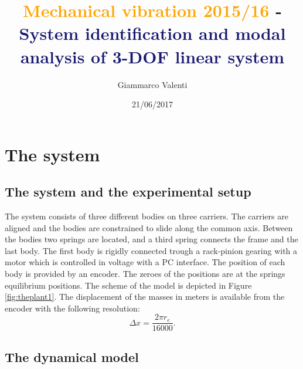 \documentclass[twosided,a4paper]{article}           %
\date{21/06/2017}
\begin{document}
	
	\title{\textcolor{Orange}{Mechanical vibration 2015/16} - \textcolor{MidnightBlue}{System identification and modal analysis of 3-DOF linear system}}
	\author{Giammarco Valenti}
	\maketitle
\section{The system}
\subsection{The system and the experimental setup}
The system consists of three different bodies on three carriers. The carriers are aligned and the bodies are constrained to slide along the common axis. Between the bodies two springs are located, and a third spring connects the frame and the last body. The first body is rigidly connected trough a rack-pinion gearing with a motor which is controlled in voltage with a PC interface. The position of each body is provided by an encoder. The zeroes of the positions are at the springs equilibrium positions. The scheme of the model is depicted in Figure \ref{fig:theplant1}.
The displacement of the masses in meters is available from the encoder with the following resolution:
\begin{equation}
	\Delta x = \dfrac{2 \pi r_e}{16000}.
	\label{eq:enc_res}
\end{equation}
\subsection{The dynamical model}
\end{document}
